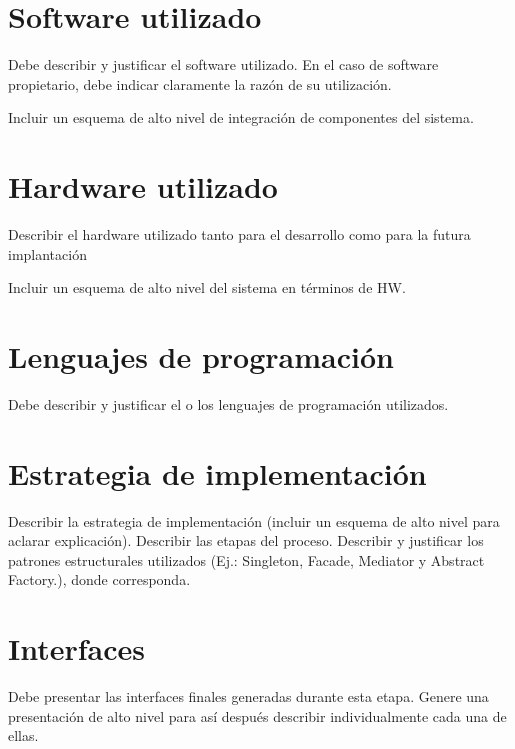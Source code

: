 \section{Software utilizado}
Debe describir y justificar el software utilizado. En el caso de software propietario, debe indicar claramente la razón de su utilización.

Incluir un esquema de alto nivel de integración de componentes del sistema.

\section{Hardware utilizado}
Describir el hardware utilizado tanto para el desarrollo como para la futura implantación 

Incluir un esquema de alto nivel del sistema en términos de HW.

\section{Lenguajes de programación}
Debe describir y justificar el o los lenguajes de programación utilizados.

\section{Estrategia de implementación}
Describir la estrategia de implementación (incluir un esquema de alto nivel para aclarar explicación). Describir las etapas del proceso. Describir y justificar los patrones estructurales utilizados (Ej.: Singleton, Facade, Mediator y Abstract Factory.), donde corresponda.

\section{Interfaces}

Debe presentar las interfaces finales generadas durante esta etapa. Genere una presentación de alto nivel para así después describir individualmente cada una de ellas. 


